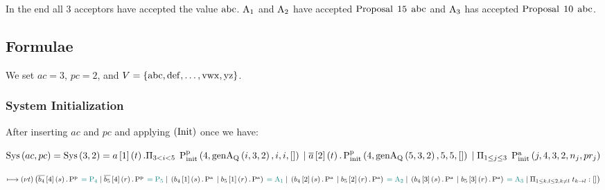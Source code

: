 In the end all $3$ acceptors have accepted the value $\ABC$.
$\Acceptor{1}$ and $\Acceptor{2}$ have accepted $\ProposalC{15}{\ABC}$ and $\Acceptor{3}$ has accepted $\ProposalC{10}{\ABC}$.

\subsection{Formulae}
We set $ac = 3$, $pc = 2$, and $V=\Curly{\ABC, \operatorname{def}, \dots, \operatorname{vwx}, \operatorname{yz}}$.

\subsubsection{System Initialization}
After inserting $ac$ and $pc$ and applying $\Init$ once we have:

$\Sys{ac}{pc} = \Sys{3}{2} =
\SessionAccept{a}{1}{t}.\ParallelFor{3 < i < 5} \PpInit{4}{\genAq{i}{3}{2}}{i}{i}{[]}\\
\Or \SessionRequest{a}{2}{t}.\PpInit{4}{\genAq{5}{3}{2}}{5}{5}{[]}\\
\Or \ParallelFor{1 \le j \le 3} \PaInit{j}{4}{3}{2}{n_j}{pr_j}$



$\longmapsto
\Nu{t}\big (
\SessionRequest{b_4}{4}{s}.\Pp \comment{= \Proposer{4}}\\
\Or \SessionRequest{b_5}{4}{r}.\Pp \comment{= \Proposer{5}}\\
\Or \Paren{\SessionAccept{b_4}{1}{s}.\Pa \Or \SessionAccept{b_5}{1}{r}.\Pa} \comment{= \Acceptor{1}}\\
\Or \Paren{\SessionAccept{b_4}{2}{s}.\Pa \Or \SessionAccept{b_5}{2}{r}.\Pa} \comment{= \Acceptor{2}}\\
\Or \Paren{\SessionAccept{b_4}{3}{s}.\Pa \Or \SessionAccept{b_5}{3}{r}.\Pa} \comment{= \Acceptor{3}}\\
\Or \OuterSessionQueues
\big )$


